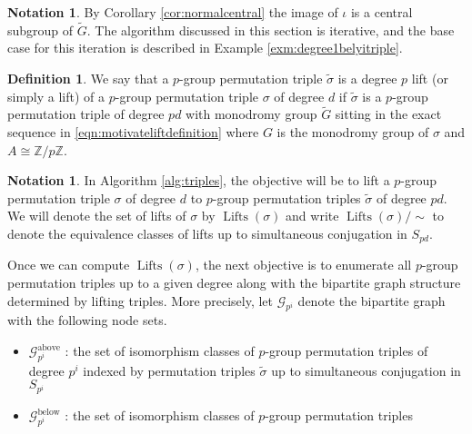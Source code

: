 \documentclass{dcthesis}
\newcommand{\ZZ}{\mathbb Z}
\newcommand{\defi}[1]{\textsf{#1}}
\newcommand{\mm}[1]{{\color{blue} \sf MM: [#1]}}
\newcommand{\wt}[1]{\widetilde{#1}}
\DeclareMathOperator{\Lifts}{Lifts}
\numberwithin{equation}{section}
\theoremstyle{definition}
\newtheorem{definition}[equation]{Definition}
\newtheorem{notation}[equation]{Notation}
\theoremstyle{remark}
\begin{document}
{{{\begin{notation}
      By Corollary \ref{cor:normalcentral}
      the image of $\iota$
      is a central subgroup of $\wt{G}$.
      The algorithm discussed in this section
      is iterative,
      and the base case for this
      iteration is described in
      Example \ref{exm:degree1belyitriple}.
    \end{notation}
    \begin{definition}
      \label{def:lift}
      We say that a
      $p$-group permutation
      triple $\wt{\sigma}$
      is a \defi{degree $p$ lift}
      (or simply a \defi{lift})
      of a $p$-group permutation triple $\sigma$
      of degree $d$
      if $\wt{\sigma}$ is
      a $p$-group permutation triple of degree $pd$
      with monodromy group $\wt{G}$
      sitting in the exact sequence
      in
      \eqref{eqn:motivateliftdefinition}
      where $G$ is the monodromy group of $\sigma$
      and $A\cong\ZZ/p\ZZ$.
    \end{definition}
    \begin{notation}
      \label{not:bipartitegraphs}
      In Algorithm \ref{alg:triples},
      the objective will be to lift a
      $p$-group permutation triple
      $\sigma$
      of degree $d$
      to $p$-group permutation
      triples $\wt{\sigma}$
      of degree $pd$.
      We will denote the set
      of lifts of $\sigma$
      by $\Lifts(\sigma)$
      and write $\Lifts(\sigma)/\!\!\sim$
      to denote the equivalence classes
      of lifts up to simultaneous conjugation
      in $S_{pd}$.
      \par
      Once we can compute
      $\Lifts(\sigma)$,
      the next objective is
      to enumerate all $p$-group permutation
      triples up to a given degree
      along with the bipartite graph
      structure determined by lifting triples.
      More precisely,
      let
      $\mathscr{G}_{p^i}$ denote the bipartite
      graph with the following node sets.
      \begin{itemize}
        \item
          $\mathscr{G}_{p^i}^\text{above}$ :
          the set of isomorphism classes
          of $p$-group permutation triples
          of degree $p^i$ indexed by
          permutation triples $\wt{\sigma}$
          up to simultaneous conjugation
          in $S_{p^i}$
        \item
          $\mathscr{G}_{p^i}^\text{below}$ :
          the set of isomorphism classes
          of $p$-group permutation triples

\end{itemize}
\end{notation}}}}
\end{document}
